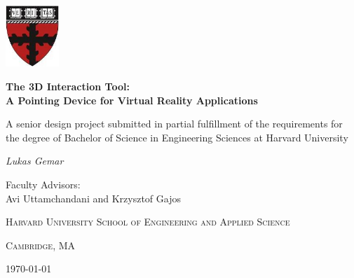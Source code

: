 \documentclass[12pt,a4paper]{report}
\begin{document}
\begin{titlepage}
	\centering
	\includegraphics[width=0.15\textwidth]{seas}\par\vspace{1cm}
	\vspace{1cm}
	{\large\bfseries The 3D Interaction Tool: \\ A Pointing Device for Virtual Reality Applications \par}
	\vspace{1cm}
	{\large A senior design project submitted in partial fulfillment of the requirements for the degree of Bachelor of Science in Engineering Sciences at Harvard University \par}
	\vspace{1cm}

    \vfill
	{\large\itshape Lukas Gemar \par}
	\vfill
	\large Faculty Advisors: \\ Avi Uttamchandani and Krzysztof Gajos\par
	\vfill

	{\large\scshape Harvard University School of Engineering and Applied Science \par}
	\vspace{0.3cm}
	{\large\scshape Cambridge, MA \par}
    \vspace{0.3cm}
	{\today\par}
\end{titlepage}
\end{document}

